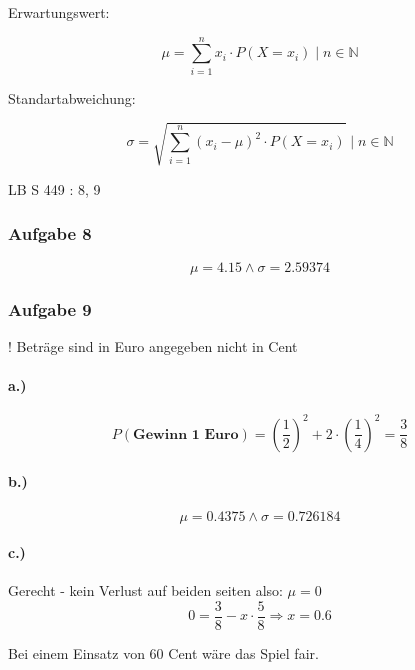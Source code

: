 \documentclass{article}
\begin{document}
Erwartungswert:

\begin{equation}
	\mu = \sum_{i=1}^{n} x_i \cdot  P(X=x_i) \mid n \in \mathbb{N} 
\end{equation}

Standartabweichung:

\begin{equation}
	\sigma = \sqrt{\sum_{i=1}^{n} (x_i - \mu)^2 \cdot  P(X=x_i)} \mid n \in \mathbb{N} 
\end{equation}

LB S 449 : 8, 9

\subsubsection*{Aufgabe 8}

\begin{equation}
	\mu = 4.15 \wedge \sigma = 2.59374
\end{equation}


\subsubsection*{Aufgabe 9}

! Beträge sind in Euro angegeben nicht in Cent

\paragraph*{a.)}
\begin{equation}
	P( \textbf{Gewinn 1 Euro}) = (\frac{1}{2})^2 + 2 \cdot (\frac{1}{4})^2 = \frac{3}{8}
\end{equation}
\paragraph*{b.)}
\begin{equation}
	\mu = 0.4375 \wedge \sigma = 0.726184
\end{equation}
\paragraph*{c.)}
Gerecht - kein Verlust auf beiden seiten also: \( \mu = 0 \)
\begin{equation}
	0 = \frac{3}{8} - x \cdot \frac{5}{8} \Rightarrow x = 0.6
\end{equation}

Bei einem Einsatz von 60 Cent wäre das Spiel fair.
\end{document}
